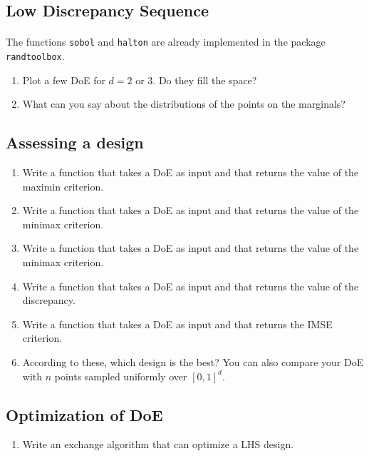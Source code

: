 \documentclass[11pt]{scrartcl}
\begin{document}
\subsection*{Low Discrepancy Sequence}
\paragraph{}
The functions \texttt{sobol} and \texttt{halton} are already implemented in the package \texttt{randtoolbox}.
\begin{enumerate}[label = Q \arabic*., resume]
	\item Plot a few DoE for $d=2$ or $3$. Do they fill the space? 
	\item What can you say about the distributions of the points on the marginals?
\end{enumerate}

\subsection*{Assessing a design}

\begin{enumerate}[label = Q \arabic*., resume]
		\item Write a function that takes a DoE as input and that returns the value of the maximin criterion.
		\item Write a function that takes a DoE as input and that returns the value of the minimax criterion.
		\item Write a function that takes a DoE as input and that returns the value of the minimax criterion.
		\item Write a function that takes a DoE as input and that returns the value of the discrepancy.
		\item Write a function that takes a DoE as input and that returns the IMSE criterion.
		\item According to these, which design is the best? You can also compare your DoE with $n$ points sampled uniformly over $[0,1]^d$.
\end{enumerate}

\subsection*{Optimization of DoE}

\begin{enumerate}[label = Q \arabic*., resume]
		\item Write an exchange algorithm that can optimize a LHS design.  
\end{enumerate}
\end{document}
